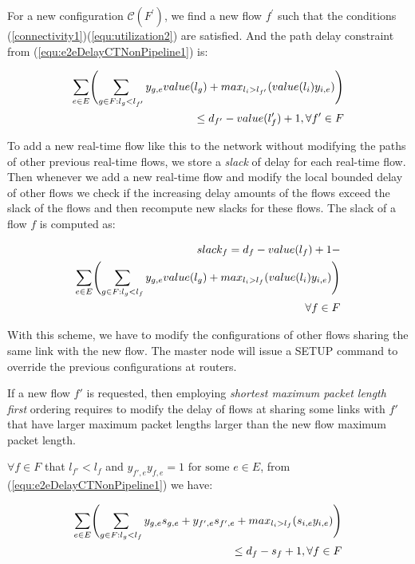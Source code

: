 \documentclass[conference, twocolumn]{IEEEtran}
\theoremstyle{definition}
\begin{document}
For a new configuration $\mathcal{C}(F^{'})$, we find a new flow $f^{'}$ such that
the conditions (\ref{connectivity1})(\ref{equ:utilization2}) are satisfied. And
the path delay constraint from (\ref{equ:e2eDelayCTNonPipeline1}) is:

\begin{eqnarray}\label{equ:e2eDelayNewPath1}
\sum_{e \in E} \Biggl(\sum_{g \in F:l_g <
l_{f'}}y_{g,e}value(l_g) +max_{l_i>l_{f'}}(value(l_i)y_{i,e})\Biggr)\notag \\
\leq d_{f'}-value(l_f') + 1, \forall f' \in F
\end{eqnarray}

To add a new real-time flow like this to the network without modifying the paths
of other previous real-time flows, we store a {\em slack} of delay for each
real-time flow. Then whenever we add a new real-time flow and modify the local
bounded delay of other flows we check if the increasing delay amounts of the
flows exceed the slack of the flows and then recompute new slacks for these
flows. The slack of a flow $f$ is computed as:

\begin{eqnarray}\label{equ:slack1}
	slack_f= d_f-value(l_f) + 1 - \notag \\
	\sum_{e \in E} \Biggl(\sum_{g \in F:l_g < l_f}y_{g,e}value(l_g)
	+max_{l_i>l_f}(value(l_i)y_{i,e})\Biggr) \notag \\ 
	\forall f \in F
\end{eqnarray}

With this scheme, we have to modify the configurations of other flows sharing
the same link with the new flow. The master node will issue a SETUP command to
override the previous configurations at routers.

If a new flow $f'$ is requested, then employing {\em shortest maximum packet
length first} ordering requires to modify the delay of flows at sharing some
links with $f'$ that have larger maximum packet lengths larger than the new flow
maximum packet length. 

$\forall f \in F$  that $l_{f'} < l_f$ and $y_{f',e}y_{f,e}=1 \mbox{ for some }
e \in E$, from (\ref{equ:e2eDelayCTNonPipeline1}) we have:

\begin{eqnarray}\label{equ:e2eDelayModification}
\sum_{e \in E} \Biggl(\sum_{g \in F:l_g <
l_f}y_{g,e}s_{g,e}+y_{f',e}s_{f',e}+max_{l_i>l_f}(s_{i,e}y_{i,e})\Biggr)\notag
\\ \leq d_f-s_f + 1, \forall f \in F
\end{eqnarray}
\end{document}

